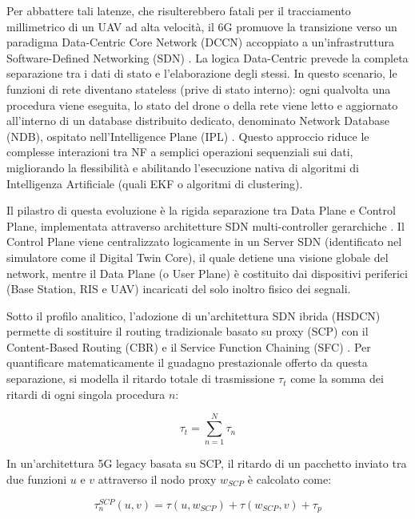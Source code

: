 \documentclass[twoside]{article}
\begin{document}
Per abbattere tali latenze, che risulterebbero fatali per il tracciamento millimetrico di un UAV ad alta velocità, il 6G promuove la transizione verso un paradigma Data-Centric Core Network (DCCN) accoppiato a un'infrastruttura Software-Defined Networking (SDN) \cite{Kolakowski2024}. La logica Data-Centric prevede la completa separazione tra i dati di stato e l'elaborazione degli stessi. In questo scenario, le funzioni di rete diventano stateless (prive di stato interno): ogni qualvolta una procedura viene eseguita, lo stato del drone o della rete viene letto e aggiornato all'interno di un database distribuito dedicato, denominato Network Database (NDB), ospitato nell'Intelligence Plane (IPL) \cite{Kolakowski2024}. Questo approccio riduce le complesse interazioni tra NF a semplici operazioni sequenziali sui dati, migliorando la flessibilità e abilitando l'esecuzione nativa di algoritmi di Intelligenza Artificiale (quali EKF o algoritmi di clustering).

Il pilastro di questa evoluzione è la rigida separazione tra Data Plane e Control Plane, implementata attraverso architetture SDN multi-controller gerarchiche \cite{Kolakowski2024}. Il Control Plane viene centralizzato logicamente in un Server SDN (identificato nel simulatore come il Digital Twin Core), il quale detiene una visione globale del network, mentre il Data Plane (o User Plane) è costituito dai dispositivi periferici (Base Station, RIS e UAV) incaricati del solo inoltro fisico dei segnali.

Sotto il profilo analitico, l'adozione di un'architettura SDN ibrida (HSDCN) permette di sostituire il routing tradizionale basato su proxy (SCP) con il Content-Based Routing (CBR) e il Service Function Chaining (SFC) \cite{Kolakowski2024}. Per quantificare matematicamente il guadagno prestazionale offerto da questa separazione, si modella il ritardo totale di trasmissione $\tau_t$ come la somma dei ritardi di ogni singola procedura $n$:

\begin{equation}
\tau_t = \sum_{n=1}^{N} \tau_n
\label{eq:total_latency}
\end{equation}

In un'architettura 5G legacy basata su SCP, il ritardo di un pacchetto inviato tra due funzioni $u$ e $v$ attraverso il nodo proxy $w_{SCP}$ è calcolato come:

\begin{equation}
\tau_n^{SCP}(u, v) = \tau(u, w_{SCP}) + \tau(w_{SCP}, v) + \tau_p
\label{eq:latency_5g_scp}
\end{equation}
\end{document}
